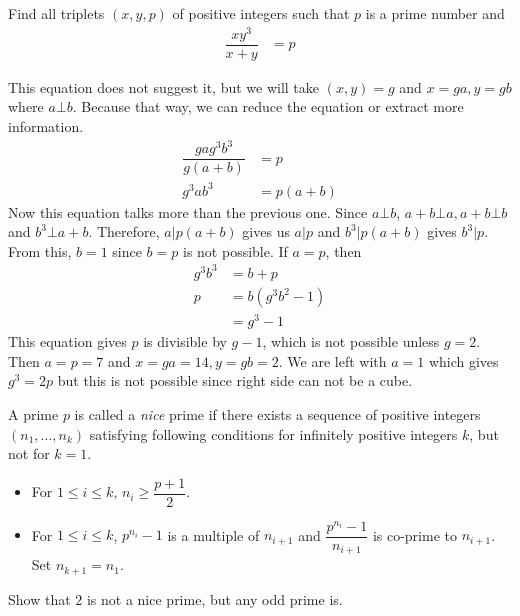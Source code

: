 \documentclass[problems.tex]{subfile}
\begin{document}
	\begin{problem}
		Find all triplets $(x, y, p)$ of positive integers such that $p$ is a prime number and
			\begin{align*}
				\dfrac{xy^3}{x+y} & = p
			\end{align*}
	\end{problem}
	
	\begin{solution}
		This equation does not suggest it, but we will take $(x,y)=g$ and $x=ga,y=gb$ where $a\bot b$. Because that way, we can reduce the equation or extract more information.
			\begin{align*}
				\dfrac{gag^3b^3}{g(a+b)} & = p\\
				g^3ab^3 & = p(a+b)
			\end{align*}
		Now this equation talks more than the previous one. Since $a\bot b$, $a+b\bot a,a+b\bot b$ and $b^3\bot a+b$. Therefore, $a|p(a+b)$ gives us $a|p$ and $b^3|p(a+b)$ gives $b^3|p$. From this, $b=1$ since $b=p$ is not possible. If $a=p$, then
			\begin{align*}
				g^3b^3 & = b+p\\
				p & = b(g^3b^2-1)\\
				  & = g^3-1
			\end{align*}
		This equation gives $p$ is divisible by $g-1$, which is not possible unless $g=2$. Then $a=p=7$ and $x=ga=14,y=gb=2$. We are left with $a=1$ which gives $g^3=2p$ but this is not possible since right side can not be a cube.
	\end{solution}
	
	\begin{problem}[Korea $2010$]
		A prime $p$ is called a \textit{nice} prime if there exists a sequence of positive integers $(n_1,\ldots,n_k)$ satisfying following conditions for infinitely positive integers $k$, but not for $k=1$.
			\begin{itemize}
				\item For $1\leq i\leq k$, $n_i\geq\dfrac{p+1}{2}$.
				\item For $1\leq i\leq k$, $p^{n_i}-1$ is a multiple of $n_{i+1}$ and $\dfrac{p^{n_i}-1}{n_{i+1}}$ is co-prime to $n_{i+1}$. Set $n_{k+1} = n_1$.
			\end{itemize}
		Show that $2$ is not a nice prime, but any odd prime is.
	\end{problem}
	
\end{document}
